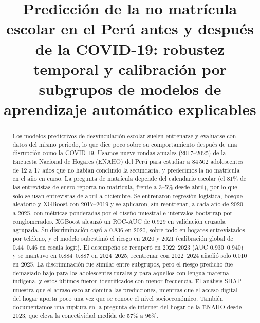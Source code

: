 \documentclass[conference]{IEEEtran}
\begin{document}
\title{Predicción de la no matrícula escolar en el Perú antes y después de la COVID-19: robustez temporal y calibración por subgrupos de modelos de aprendizaje automático explicables}

\author{
}

\maketitle

\begin{abstract}
Los modelos predictivos de desvinculación escolar suelen entrenarse y evaluarse con datos del mismo periodo, lo que dice poco sobre su comportamiento después de una disrupción como la COVID-19. Usamos nueve rondas anuales (2017--2025) de la Encuesta Nacional de Hogares (ENAHO) del Perú para estudiar a 84\,502 adolescentes de 12 a 17 años que no habían concluido la secundaria, y predecimos la no matrícula en el año en curso. La pregunta de matrícula depende del calendario escolar (el 81\% de las entrevistas de enero reporta no matrícula, frente a 3--5\% desde abril), por lo que solo se usan entrevistas de abril a diciembre. Se entrenaron regresión logística, bosque aleatorio y XGBoost con 2017--2019 y se aplicaron, sin reentrenar, a cada año de 2020 a 2025, con métricas ponderadas por el diseño muestral e intervalos bootstrap por conglomerados. XGBoost alcanzó un ROC-AUC de 0.929 en validación cruzada agrupada. Su discriminación cayó a 0.836 en 2020, sobre todo en hogares entrevistados por teléfono, y el modelo subestimó el riesgo en 2020 y 2021 (calibración global de 0.44--0.46 en escala logit). El desempeño se recuperó en 2022--2023 (AUC 0.930--0.940) y se mantuvo en 0.884--0.887 en 2024--2025; reentrenar con 2022--2024 añadió solo 0.010 en 2025. La discriminación fue similar entre subgrupos, pero el riesgo predicho fue demasiado bajo para los adolescentes rurales y para aquellos con lengua materna indígena, y estos últimos fueron identificados con menor frecuencia. El análisis SHAP muestra que el atraso escolar domina las predicciones, mientras que el acceso digital del hogar aporta poco una vez que se conoce el nivel socioeconómico. También documentamos una ruptura en la pregunta de internet del hogar de la ENAHO desde 2023, que eleva la conectividad medida de 57\% a 96\%.
\end{abstract}
\end{document}
